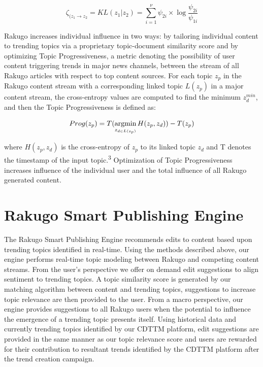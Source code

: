 \documentclass{article}
\begin{document}
\begin{equation*}
\zeta_{(z_{1} \rightarrow z_{2}} = KL(z_{1} | z_{2}) = \sum^{\nu}_{i=1} \psi_{2i} \times \log \frac{\psi_{2i}}{\psi_{1i}} 
\end{equation*}

Rakugo increases individual influence in two ways: by tailoring individual content to trending topics via a proprietary topic-document similarity score and by optimizing Topic Progressiveness, a metric denoting the possibility of user content triggering trends in major news channels, between the stream of all Rakugo articles with respect to top content sources. For each topic $z_{p}$ in the Rakugo content stream with a corresponding linked topic $L(z_{p})$ in a major content stream, the cross-entropy values are computed to find the minimum \begin{math} z^{min}_{d} \end{math}, and then the Topic Progressiveness is defined as:

\begin{equation*}
Prog(z_{p}) = T(\operatornamewithlimits{argmin}\limits_{z_{d\in L(z_{p})}} H(z_{p}, z_{d})) - T(z_{p})
\end{equation*}

where \begin{math} H(z_{p},z_{d}) \end{math} is the cross-entropy of \begin{math} z_{p} \end{math} to its linked topic \begin{math} z_{d} \end{math} and T denotes the timestamp of the input topic.\textsuperscript{3} Optimization of Topic Progressiveness increases influence of the individual user and the total influence of all Rakugo generated content.

\section{Rakugo Smart Publishing Engine}
The Rakugo Smart Publishing Engine recommends edits to content based upon trending topics identified in real-time. Using the methods described above, our engine performs real-time topic modeling between Rakugo and competing content streams. From the user's perspective we offer on demand edit suggestions to align sentiment to trending topics. A topic similarity score is generated by our matching algorithm between content and trending topics, suggestions to increase topic relevance are then provided to the user. From a macro perspective, our engine provides suggestions to all Rakugo users when the potential to influence the emergence of a trending topic presents itself. Using historical data and currently trending topics identified by our CDTTM platform, edit suggestions are provided in the same manner as our topic relevance score and users are rewarded for their contribution to resultant trends identified by the CDTTM platform after the trend creation campaign.
\end{document}
